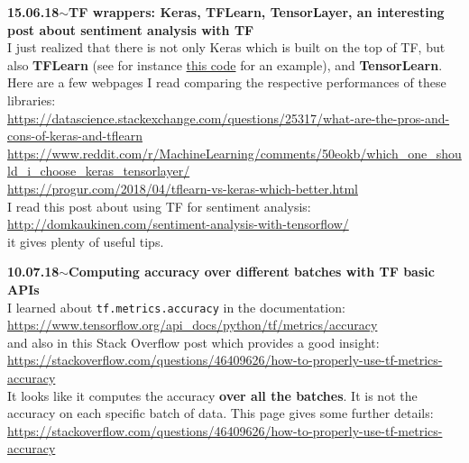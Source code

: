 \documentclass[11pt,a4paper]{article}
\newenvironment{loggentry}[2]%
{\noindent\textbf{#1}\hspace{1cm}$\mathbf{\sim}$\text{ }\textbf{#2}\\}{\vspace{0.5cm}}
\begin{document}
\begin{loggentry}{15.06.18}{TF wrappers: Keras, TFLearn, TensorLayer, an interesting post about sentiment analysis with TF}
I just realized that there is not only Keras which is built on the top of TF, but also \textbf{TFLearn} (see for instance \href{https://github.com/tflearn/tflearn/blob/master/examples/nlp/lstm.py}{this code} for an example), and \textbf{TensorLearn}. Here are a few webpages I read comparing the respective performances of these libraries:\\
\url{https://datascience.stackexchange.com/questions/25317/what-are-the-pros-and-cons-of-keras-and-tflearn}\\
\url{https://www.reddit.com/r/MachineLearning/comments/50eokb/which_one_should_i_choose_keras_tensorlayer/}\\
\url{https://progur.com/2018/04/tflearn-vs-keras-which-better.html}\\

I read this post about using TF for sentiment analysis:\\
\url{http://domkaukinen.com/sentiment-analysis-with-tensorflow/}\\
it gives plenty of useful tips.
\end{loggentry}

\begin{loggentry}{10.07.18}{Computing accuracy over different batches with TF basic APIs}
I learned about \texttt{tf.metrics.accuracy} in the documentation:\\
\url{https://www.tensorflow.org/api_docs/python/tf/metrics/accuracy}\\
and also in this Stack Overflow post which provides a good insight:\\
\url{https://stackoverflow.com/questions/46409626/how-to-properly-use-tf-metrics-accuracy}\\
It looks like it computes the accuracy \textbf{over all the batches}. It is not the accuracy on each specific batch of data. This page gives some further details:\\
\url{https://stackoverflow.com/questions/46409626/how-to-properly-use-tf-metrics-accuracy}\\
\end{loggentry}
\end{document}
